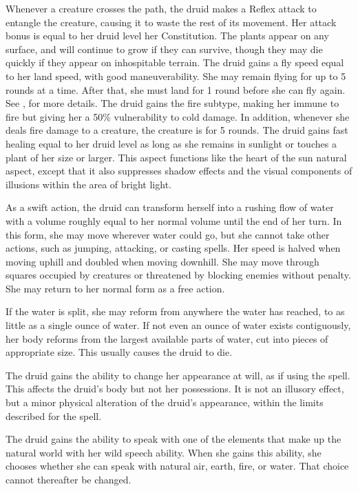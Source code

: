 Whenever a creature crosses the path, the druid makes a Reflex attack to entangle the creature, causing it to waste the rest of its movement.
Her attack bonus is equal to her druid level \add her Constitution.
The plants appear on any surface, and will continue to grow if they can survive, though they may die quickly if they appear on inhospitable terrain.
The druid gains a fly speed equal to her land speed, with good maneuverability.
She may remain flying for up to 5 rounds at a time.
After that, she must land for 1 round before she can fly again.
See , for more details.
The druid gains the fire subtype, making her immune to fire but giving her a 50\% vulnerability to cold damage.
In addition, whenever she deals fire damage to a creature, the creature is \ignited for 5 rounds.
The druid gains fast healing equal to her druid level as long as she remains in sunlight or touches a plant of her size or larger.
This aspect functions like the heart of the sun natural aspect, except that it also suppresses shadow effects and the visual components of illusions within the area of bright light.

As a swift action, the druid can transform herself into a rushing flow of water with a volume roughly equal to her normal volume until the end of her turn.
In this form, she may move wherever water could go, but she cannot take other actions, such as jumping, attacking, or casting spells.
Her speed is halved when moving uphill and doubled when moving downhill.
She may move through squares occupied by creatures or threatened by blocking enemies without penalty.
She may return to her normal form as a free action.
\par If the water is split, she may reform from anywhere the water has reached, to as little as a single ounce of water.
If not even an ounce of water exists contiguously, her body reforms from the largest available parts of water, cut into pieces of appropriate size.
This usually causes the druid to die.

 The druid gains the ability to change her appearance at will, as if using the 
spell.
This affects the druid's body but not her possessions.
It is not an illusory effect, but a minor physical alteration of the druid's appearance, within the limits described for the spell.

The druid gains the ability to speak with one of the elements that make up the natural world with her wild speech ability.
When she gains this ability, she chooses whether she can speak with natural air, earth, fire, or water.
That choice cannot thereafter be changed.

